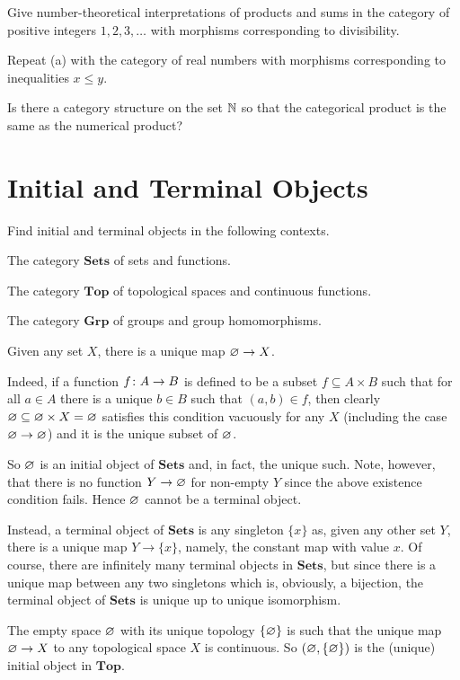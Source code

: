 \bs
\ben[label=(\alph*)]
\item
\item
\item
\een
\es

\bx
\ben[label=(\alph*)]
\item Give number-theoretical interpretations of products and sums in the category of positive integers $1,2,3,\ldots$ with morphisms corresponding to divisibility.
\item Repeat (a) with the category of real numbers with morphisms corresponding to inequalities $x \leq y$.
\item Is there a category structure on the set $\mathbb{N}$ so that the categorical product is the same as the numerical product?
\een
\ex

\bs
\ben[label=(\alph*)]
\item
\item
\item
\een
\es


\section{Initial and Terminal Objects}

\bx
Find initial and terminal objects in the following contexts.
\ben[label=(\alph*)]
\item The category $\mathbf{Sets}$ of sets and functions.
\item The category $\mathbf{Top}$ of topological spaces and continuous functions.
\item The category $\mathbf{Grp}$ of groups and group homomorphisms.
\een
\ex

\bs
\ben[label=(\alph*)]
\item Given any set $X$, there is a unique map $\varnothing \to X$. 

Indeed, if a function $f\colon A\to B$ is defined to be a subset $f\subseteq A\times B$ such that for all $a\in A$ there is a unique $b\in B$ such that $(a,b)\in f$, then clearly $\varnothing \subseteq \varnothing \times X=\varnothing$ satisfies this condition vacuously for any $X$ (including the case $\varnothing\to\varnothing$) and it is the unique subset of $\varnothing$.

So $\varnothing$ is an initial object of $\mathbf{Sets}$ and, in fact, the unique such.
Note, however, that there is no function $Y\to \varnothing$ for non-empty $Y$ since the above existence condition fails. Hence $\varnothing$ cannot be a terminal object.

Instead, a terminal object of $\mathbf{Sets}$ is any singleton $\{x\}$ as, given any other set $Y$, there is a unique map $Y\to \{x\}$, namely, the constant map with value $x$. Of course, there are infinitely many terminal objects in $\mathbf{Sets}$, but since there is a unique map between any two singletons which is, obviously, a bijection, the terminal object of $\mathbf{Sets}$ is unique up to unique isomorphism.
\item The empty space $\varnothing$ with its unique topology $\{\varnothing\}$ is such that the unique map $\varnothing\to X$ to any topological space $X$ is continuous. So $(\varnothing,\{\varnothing\})$ is the (unique) initial object in $\mathbf{Top}$.

